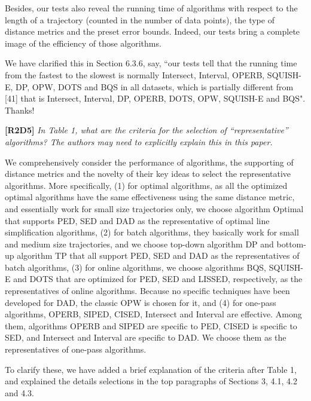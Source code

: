 \documentclass{letter}
\begin{document}
{{Besides, our tests also reveal the running time of algorithms with respect to the length of a trajectory (counted in the number of data points), the type of distance metrics and the preset error bounds. Indeed, our tests bring a complete image of the efficiency of those algorithms.



We have clarified this in Section 6.3.6, say, ``our tests tell that the running time from the fastest to the slowest is normally Intersect, Interval, OPERB, SQUISH-E, DP, OPW, DOTS and BQS in all datasets, which is partially different from [41] that is Intersect, Interval, DP, OPERB, DOTS, OPW, SQUISH-E and BQS". Thanks!




\textbf{[R2D5]} \emph{In Table 1, what are the criteria for the selection of “representative” algorithms? The authors may need to explicitly explain this in this paper.}

We comprehensively consider the performance of algorithms, the supporting of distance metrics and the novelty of their key ideas to select the representative algorithms. More specifically, 
(1) for optimal algorithms, {as all the optimized optimal algorithms have the same effectiveness using the same distance metric, and essentially work for small size trajectories only, we choose algorithm Optimal that supports PED, SED and DAD as the representative of optimal line simplification algorithms,}
%
(2) for batch algorithms, {they basically work for small and medium size trajectories, and we choose top-down algorithm DP and bottom-up algorithm TP that all support PED, SED and DAD as the representatives of batch algorithms,}
%
(3) for online algorithms, {we choose algorithms BQS, SQUISH-E and DOTS that are optimized for PED, SED and LISSED, respectively, as the representatives of online algorithms. Because no specific techniques have been developed for DAD, the classic OPW is chosen for it,} and
%
(4) for one-pass algorithms, OPERB, SIPED, CISED, Intersect and Interval are effective. Among them, algorithms OPERB and SIPED are specific to PED, CISED is specific to SED, and Intersect and Interval are specific to DAD. We choose them as the representatives of one-pass algorithms.

To clarify these, we have added a brief explanation of the criteria after Table 1, and explained the details selections in the top paragraphs of Sections 3, 4.1, 4.2 and 4.3. 

}}
\end{document}
